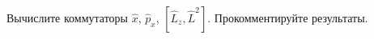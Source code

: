 \documentclass[__main__.tex]{subfiles}
\begin{document}
Вычислите коммутаторы $\hat{x}$, $\hat{p}_x$, $\left[\hat{L}_z,\hat{L}^2\right]$. Прокомментируйте результаты.\\ 

\end{document}
